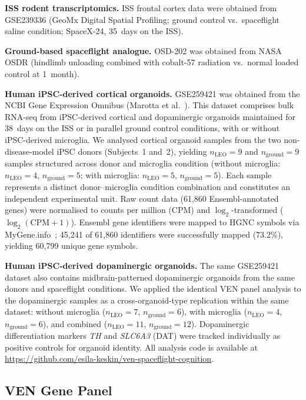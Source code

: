 \documentclass[11pt]{article}
\begin{document}
\textbf{ISS rodent transcriptomics.}
ISS frontal cortex data were obtained from GSE239336 (GeoMx Digital Spatial
Profiling; ground control vs.\ spaceflight saline condition; SpaceX-24,
35~days on the ISS).

\textbf{Ground-based spaceflight analogue.}
OSD-202 was obtained from NASA OSDR (hindlimb unloading combined with
cobalt-57 radiation vs.\ normal loaded control at 1~month).

\textbf{Human iPSC-derived cortical organoids.}
GSE259421 was obtained from the NCBI Gene Expression Omnibus
(Marotta et al.~\cite{marotta2024}).
This dataset comprises bulk RNA-seq from iPSC-derived cortical and
dopaminergic organoids maintained for 38~days on the ISS or in parallel
ground control conditions, with or without iPSC-derived microglia.
We analysed cortical organoid samples from the two non-disease-model
iPSC donors (Subjects~1 and~2), yielding $n_{\text{LEO}}=9$ and
$n_{\text{ground}}=9$ samples structured across donor and microglia
condition (without microglia: $n_{\text{LEO}}=4$, $n_{\text{ground}}=5$;
with microglia: $n_{\text{LEO}}=5$, $n_{\text{ground}}=5$).
Each sample represents a distinct donor--microglia condition combination
and constitutes an independent experimental unit.
Raw count data (61,860 Ensembl-annotated genes) were normalised to counts
per million (CPM) and $\log_2$-transformed ($\log_2(\text{CPM}+1)$).
Ensembl gene identifiers were mapped to HGNC symbols via
MyGene.info~\cite{xin2016}; 45,241 of 61,860 identifiers were successfully
mapped (73.2\%), yielding 60,799 unique gene symbols.

\textbf{Human iPSC-derived dopaminergic organoids.}
The same GSE259421 dataset also contains midbrain-patterned dopaminergic
organoids from the same donors and spaceflight conditions.
We applied the identical VEN panel analysis to the dopaminergic samples
as a cross-organoid-type replication within the same dataset:
without microglia ($n_{\text{LEO}}=7$, $n_{\text{ground}}=6$),
with microglia ($n_{\text{LEO}}=4$, $n_{\text{ground}}=6$),
and combined ($n_{\text{LEO}}=11$, $n_{\text{ground}}=12$).
Dopaminergic differentiation markers \textit{TH} and \textit{SLC6A3}
(DAT) were tracked individually as positive controls for organoid identity.
All analysis code is available at
\url{https://github.com/esila-keskin/ven-spaceflight-cognition}.

\subsection{VEN Gene Panel}
\end{document}

